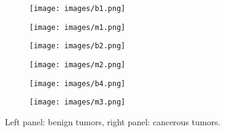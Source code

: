 \begin{figure*}
   	\centering
   	\begin{subfigure}[b]{0.3\textwidth}
   		\centering
   		\texttt{[image: images/b1.png]}
   	\end{subfigure}
   	\quad
   	\begin{subfigure}[b]{0.3\textwidth}  
   		\centering 
   		\texttt{[image: images/m1.png]}
   	\end{subfigure}
   	\vskip 12pt
   	\begin{subfigure}[b]{0.3\textwidth}   
   		\centering 
   		\texttt{[image: images/b2.png]}
   	\end{subfigure}
   	\quad
   	\begin{subfigure}[b]{0.3\textwidth}   
   		\centering 
   		\texttt{[image: images/m2.png]}
   	\end{subfigure}
   	\vskip 12pt
   	\begin{subfigure}[b]{0.3\textwidth}   
   		\centering 
   		\texttt{[image: images/b4.png]}
   	\end{subfigure}
   	\quad
   	\begin{subfigure}[b]{0.3\textwidth}   
   		\centering 
   		\texttt{[image: images/m3.png]}
   	\end{subfigure}
   	\caption[ Left panel: benign tumors, right panel: cancerous tumors. ]
   	{\small Left panel: benign tumors, right panel: cancerous tumors.} 
   	\label{fig:bening-malignant}
\end{figure*}